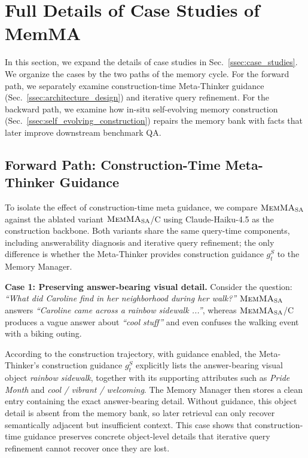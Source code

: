 \section{Full Details of Case Studies of MemMA}
\label{appendix:case_studies_details}
In this section, we expand the details of case studies in Sec.~\ref{ssec:case_studies}.
We organize the cases by the two paths of the memory cycle.
For the forward path, we separately examine construction-time Meta-Thinker guidance (Sec.~\ref{ssec:architecture_design}) and iterative query refinement.
For the backward path, we examine how in-situ self-evolving memory construction (Sec.~\ref{ssec:self_evolving_construction}) repairs the memory bank with facts that later improve downstream benchmark QA.


\subsection{Forward Path: Construction-Time Meta-Thinker Guidance}
\label{appendix:case_construction_guidance}

To isolate the effect of construction-time meta guidance, we compare $\textnormal{\textsc{MemMA}}_{\mathrm{SA}}$ against the ablated variant $\textnormal{\textsc{MemMA}}_{\mathrm{SA}}$/C using Claude-Haiku-4.5 as the construction backbone.
Both variants share the same query-time components, including answerability diagnosis and iterative query refinement; the only difference is whether the Meta-Thinker provides construction guidance $g_t^S$ to the Memory Manager.

\noindent\textbf{Case 1: Preserving answer-bearing visual detail.}
Consider the question: \emph{``What did Caroline find in her neighborhood during her walk?''}
$\textnormal{\textsc{MemMA}}_{\mathrm{SA}}$ answers \emph{``Caroline came across a rainbow sidewalk ...''}, whereas $\textnormal{\textsc{MemMA}}_{\mathrm{SA}}$/C produces a vague answer about \emph{``cool stuff''} and even confuses the walking event with a biking outing.

According to the construction trajectory,  
with guidance enabled, the Meta-Thinker's construction guidance $g_t^S$ explicitly lists the answer-bearing visual object \emph{rainbow sidewalk}, together with its supporting attributes such as \emph{Pride Month} and \emph{cool / vibrant / welcoming}.
The Memory Manager then stores a clean entry containing the exact answer-bearing detail.
Without guidance, this object detail is absent from the memory bank, so later retrieval can only recover semantically adjacent but insufficient context.
This case shows that construction-time guidance preserves concrete object-level details that iterative query refinement cannot recover once they are lost.


